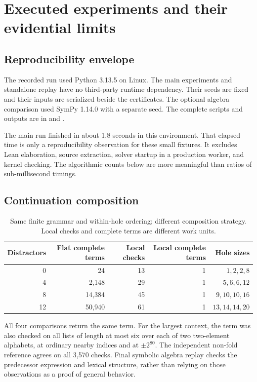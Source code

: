 \section{Executed experiments and their evidential limits}
\label{sec:experiments}

\subsection{Reproducibility envelope}

The recorded run used Python 3.13.5 on Linux. The main experiments and standalone
replay have no third-party runtime dependency. Their seeds are fixed and their
inputs are serialized beside the certificates. The optional algebra comparison
used SymPy 1.14.0 with a separate seed. The complete scripts and outputs are in
 and .

The main run finished in about 1.8 seconds in this environment. That elapsed
time is only a reproducibility observation for these small fixtures. It excludes
Lean elaboration, source extraction, solver startup in a production worker, and
kernel checking. The algorithmic counts below are more meaningful than ratios
of sub-millisecond timings.

\subsection{Continuation composition}

\begin{table}[ht]
\centering\small
\begin{tabular}{@{}rrrrr@{}}
\toprule
Distractors & Flat complete terms & Local checks & Local complete terms & Hole sizes \\
\midrule
0 & 24 & 13 & 1 & $1,2,2,8$ \\
4 & 2,148 & 29 & 1 & $5,6,6,12$ \\
8 & 14,384 & 45 & 1 & $9,10,10,16$ \\
12 & 50,940 & 61 & 1 & $13,14,14,20$ \\
\bottomrule
\end{tabular}
\caption{Same finite grammar and within-hole ordering; different composition strategy. Local checks and complete terms are different work units.}
\end{table}

All four comparisons return the same term. For the largest context, the term was
also checked on all lists of length at most six over each of two two-element
alphabets, at ordinary nearby indices and at $\pm2^{80}$. The independent
non-fold reference agrees on all 3,570 checks. Final symbolic algebra replay
checks the predecessor expression and lexical structure, rather than relying on
those observations as a proof of general behavior.

